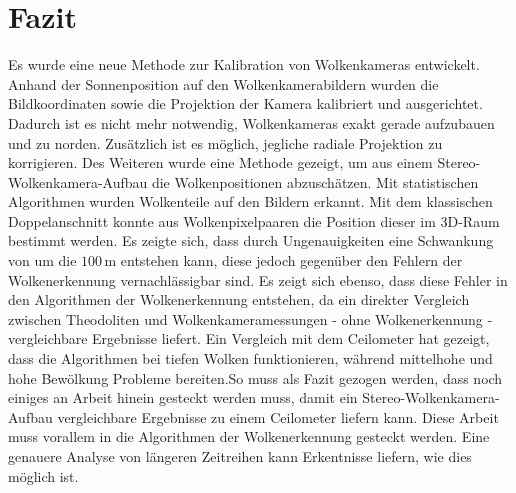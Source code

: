 \documentclass[a4paper,11pt,twoside,german]{article}
\newcommand{\absatz}{\smallbreak}
\newcommand{\literaturverzeichnis}[1]{
    \renewcommand{\harvardand}{und} %
    
    }
\begin{document}


\newpage
\section{Fazit}
Es wurde eine neue Methode zur Kalibration von Wolkenkameras entwickelt. Anhand
der Sonnenposition auf den Wolkenkamerabildern wurden die Bildkoordinaten sowie
die Projektion der Kamera kalibriert und ausgerichtet. Dadurch ist es nicht
mehr notwendig, Wolkenkameras exakt gerade aufzubauen und zu norden. Zusätzlich
ist es möglich, jegliche radiale Projektion zu korrigieren. Des Weiteren
wurde eine Methode gezeigt, um aus einem Stereo-Wolkenkamera-Aufbau die
Wolkenpositionen abzuschätzen. Mit statistischen Algorithmen wurden Wolkenteile
auf den Bildern erkannt. Mit dem klassischen Doppelanschnitt konnte aus
Wolkenpixelpaaren die Position dieser im 3D-Raum bestimmt werden. Es zeigte
sich, dass durch Ungenauigkeiten eine Schwankung von um die $100\,\mathrm{m}$
entstehen kann, diese jedoch gegenüber den Fehlern der Wolkenerkennung
vernachlässigbar sind. Es zeigt sich ebenso, dass diese Fehler in den
Algorithmen der Wolkenerkennung entstehen, da ein direkter Vergleich zwischen
Theodoliten und Wolkenkameramessungen - ohne Wolkenerkennung - vergleichbare
Ergebnisse liefert. Ein Vergleich mit dem Ceilometer hat gezeigt, dass die
Algorithmen bei tiefen Wolken funktionieren, während mittelhohe und hohe
Bewölkung Probleme bereiten.\absatz So muss als Fazit gezogen werden, dass noch
einiges an Arbeit hinein gesteckt werden muss, damit ein
Stereo-Wolkenkamera-Aufbau vergleichbare Ergebnisse zu einem Ceilometer liefern
kann. Diese Arbeit muss vorallem in die Algorithmen der Wolkenerkennung gesteckt
werden. Eine genauere Analyse von längeren Zeitreihen kann Erkentnisse liefern,
wie dies möglich ist.



\literaturverzeichnis{bibliography} %
\end{document}
